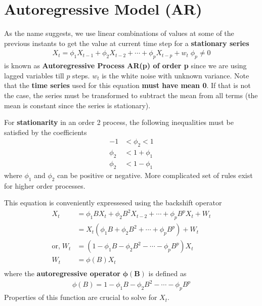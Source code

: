 \documentclass[../../time_series_notes.tex]{subfiles}
\begin{document}
\section{Autoregressive Model (AR)}
As the name suggests, we use linear combinations of values at some of the previous instants to get the value at current time step for a \textbf{stationary series}
\begin{align*}
    X_{t} = \phi_{1}X_{t-1} + \phi_{2}X_{t-2} + \cdots + \phi_{p}X_{t-p} + w_{t} \; \phi_{p} \neq 0
\end{align*}
is known as \textbf{Autoregressive Process AR(p) of order p} since we are using lagged variables till $p$ steps. $w_{t}$ is the white noise with unknown variance. Note that the \textbf{time series} used for this equation \textbf{must have mean 0}. If that is not the case, the series must be transformed to subtract the mean from all terms (the mean is constant since the series is stationary).\newline

For \textbf{stationarity} in an order 2 process, the following inequalities must be satisfied by the coefficients
\begin{align*}
    -1 &< \phi_{2} < 1\\
    \phi_{2} &< 1 + \phi_{1}\\
    \phi_{2} &< 1 - \phi_{1}
\end{align*}
where $\phi_{1}$ and $\phi_{2}$ can be positive or negative. More complicated set of rules exist for higher order processes.\newline

This equation is conveniently expressesed using the backshift operator
\begin{align*}
    X_{t} &= \phi_{1}BX_{t} + \phi_{2}B^{2}X_{t-2} + \cdots + \phi_{p}B^{p}X_{t} + W_{t}\\
    &= X_{t}(\phi_{1}B + \phi_{2}B^{2} + \cdots + \phi_{p}B^{p}) + W_{t}\\
    \text{or,} \; W_{t} &= (1 - \phi_{1}B - \phi_{2}B^{2} - \cdots - \phi_{p}B^{p})X_{t}\\
    W_{t} &= \phi(B)X_{t}\\
\end{align*}
where the \textbf{autoregressive operator} $\bm{\phi(B)}$ is defined as
\begin{align*}
    \phi(B) = 1 - \phi_{1}B - \phi_{2}B^{2} - \cdots - \phi_{p}B^{p}
\end{align*}
Properties of this function are crucial to solve for $X_{t}$.
\end{document}
